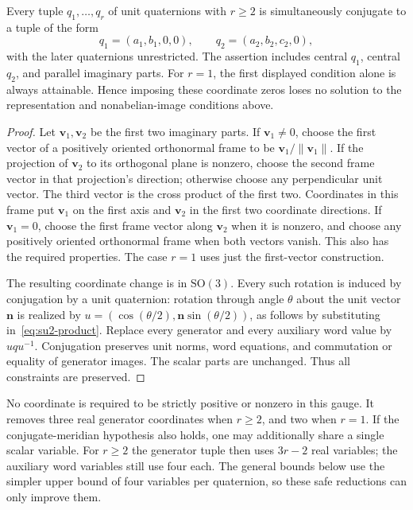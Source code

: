 \begin{lemma}
\label{lem:su2-gauge}
Every tuple $q_1,\ldots,q_r$ of unit quaternions with $r\geq2$ is
simultaneously conjugate to a tuple of the form
\[
 q_1=(a_1,b_1,0,0),\qquad q_2=(a_2,b_2,c_2,0),
\]
with the later quaternions unrestricted.  The assertion includes central
$q_1$, central $q_2$, and parallel imaginary parts.  For $r=1$, the
first displayed condition alone is always attainable.  Hence imposing
these coordinate zeros loses no solution to the representation and
nonabelian-image conditions above.
\end{lemma}

\begin{proof}
Let $\mathbf v_1,\mathbf v_2$ be the first two imaginary parts.  If
$\mathbf v_1\ne0$, choose the first vector of a positively oriented
orthonormal frame to be $\mathbf v_1/\|\mathbf v_1\|$.
If the projection of $\mathbf v_2$ to its orthogonal plane is nonzero,
choose the second frame vector in that projection's direction; otherwise
choose any perpendicular unit vector.  The third vector is the cross
product of the first two.  Coordinates in this frame put $\mathbf v_1$
on the first axis and $\mathbf v_2$ in the first two coordinate directions.
If $\mathbf v_1=0$, choose the first frame vector along $\mathbf v_2$
when it is nonzero, and choose any positively oriented orthonormal frame
when both vectors vanish.  This also has the required properties.  The
case $r=1$ uses just the first-vector construction.

The resulting coordinate change is in $\mathrm{SO}(3)$.  Every such
rotation is induced by conjugation by a unit quaternion: rotation through
angle $\theta$ about the unit vector $\mathbf n$ is realized by
$u=(\cos(\theta/2),\mathbf n\sin(\theta/2))$, as follows by
substituting in~\eqref{eq:su2-product}.  Replace every generator and
every auxiliary word value by $uqu^{-1}$.  Conjugation preserves unit
norms, word equations, and commutation or equality of generator images.
The scalar parts are unchanged.  Thus all constraints are preserved.
\end{proof}

No coordinate is required to be strictly positive or nonzero in this
gauge.  It removes three real generator coordinates when $r\geq2$,
and two when $r=1$.  If the conjugate-meridian hypothesis also holds,
one may additionally share a single scalar variable.  For $r\geq2$
the generator tuple then uses $3r-2$ real variables; the auxiliary word
variables still use four each.  The general bounds below use the simpler
upper bound of four variables per quaternion, so these safe reductions
can only improve them.

